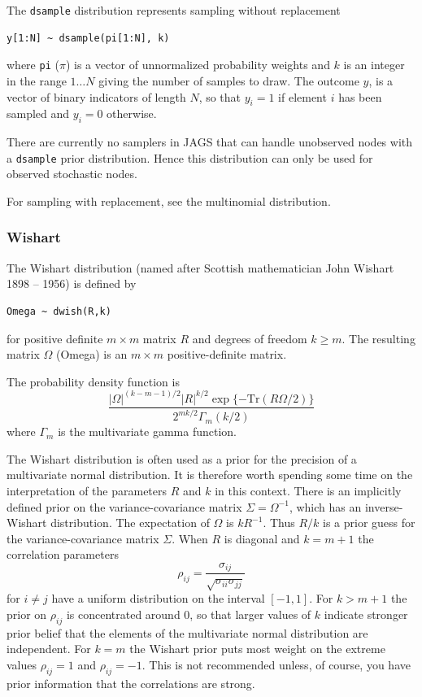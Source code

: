 \documentclass[11pt, a4paper, titlepage]{report}
\begin{document}
{The \texttt{dsample} distribution represents sampling without replacement
\begin{verbatim}
y[1:N] ~ dsample(pi[1:N], k)
\end{verbatim}
where \texttt{pi} ($\pi$) is a vector of unnormalized probability
weights and $k$ is an integer in the range $1 \ldots N$ giving the
number of samples to draw. The outcome $y$, is a vector of binary
indicators of length $N$, so that $y_i = 1$ if element $i$ has been
sampled and $y_i = 0$ otherwise.

There are currently no samplers in JAGS that can handle unobserved
nodes with a \texttt{dsample} prior distribution. Hence this
distribution can only be used for observed stochastic nodes.

For sampling with replacement, see the multinomial distribution.

\subsubsection{Wishart}
\label{bugs:dwishart}

The Wishart distribution (named after Scottish mathematician John
Wishart 1898 -- 1956) is defined by
\begin{verbatim}
Omega ~ dwish(R,k)
\end{verbatim}
for positive definite $m \times m$ matrix $R$ and degrees of freedom
$k \geq m$. The resulting matrix $\Omega$ (Omega) is an $m \times m$
positive-definite matrix.

The probability density function is
\[
\frac{\textstyle |\Omega|^{(k-m-1)/2} |R|^{k/2}
  \exp\{-\text{Tr}(R\Omega/2)\}} {\textstyle 2^{mk/2} \Gamma_m
  (k/2)}
\]
where $\Gamma_m$ is the multivariate gamma function.

The Wishart distribution is often used as a prior for the precision of
a multivariate normal distribution. It is therefore worth spending
some time on the interpretation of the parameters $R$ and $k$ in this
context. There is an implicitly defined prior on the
variance-covariance matrix $\Sigma = \Omega^{-1}$, which has an
inverse-Wishart distribution. The expectation of $\Omega$ is
$kR^{-1}$. Thus $R/k$ is a prior guess for the variance-covariance
matrix $\Sigma$. When $R$ is diagonal and $k=m+1$ the correlation
parameters
\[
\rho_{ij} = \frac{\sigma_{ij}}{\sqrt{\sigma_{ii} \sigma_{jj}}}
\]
for $i \neq j$ have a uniform distribution on the interval
$[-1,1]$. For $k > m+1$ the prior on $\rho_{ij}$ is concentrated
around $0$, so that larger values of $k$ indicate stronger prior
belief that the elements of the multivariate normal distribution are
independent. For $k=m$ the Wishart prior puts most weight on the
extreme values $\rho_{ij} = 1$ and $\rho_{ij} = -1$. This is not
recommended unless, of course, you have prior information that the
correlations are strong.

}
\end{document}
